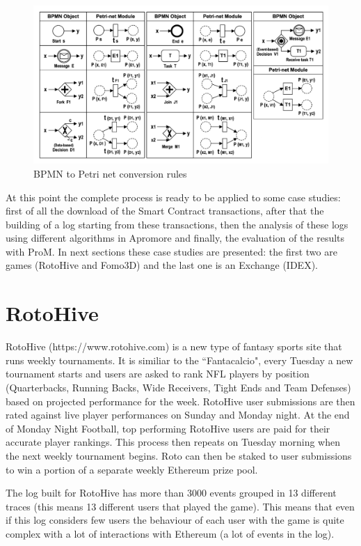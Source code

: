 \begin{figure}[!ht]
    \centering
\includegraphics[width=\textwidth]{images/BPMNtoPN_rules.png}
    \caption{BPMN to Petri net conversion rules \cite{DBLP:journals/BPMNtoPN}}
    \label{images:BPMNtoPN_rules}
\end{figure}

At this point the complete process is ready to be applied to some case studies: first of all the download of the Smart Contract 
transactions, after that the building of a log starting from these transactions, then the analysis of these logs using 
different algorithms in Apromore and finally, the evaluation of the results with ProM.
In next sections these case studies are presented: the first two are games (RotoHive and Fomo3D) and the last one is an 
Exchange (IDEX).


\section{RotoHive}
\label{case_studies:roto}
RotoHive (https://www.rotohive.com) is a new type of fantasy sports site that runs weekly tournaments. It is similiar to the ``Fantacalcio", every 
Tuesday a new tournament starts and users are asked to rank NFL players by position (Quarterbacks, Running Backs, 
Wide Receivers, Tight Ends and Team Defenses) based on projected performance for the week. RotoHive user submissions are 
then rated against live player performances on Sunday and Monday night. At the end of Monday Night Football, top performing 
RotoHive users are paid for their accurate player rankings. This process then repeats on Tuesday morning when the next 
weekly tournament begins. Roto can then be staked to user submissions to win a portion of a separate weekly Ethereum prize 
pool.

The log built for RotoHive has more than 3000 events grouped in 13 different traces (this means 13 different users that played the game).
This means that even if this log considers few users the behaviour of each user with the game is quite complex with a lot of 
interactions with Ethereum (a lot of events in the log).

